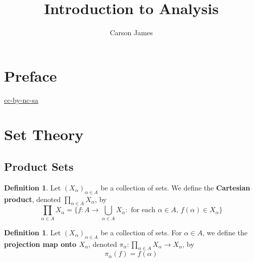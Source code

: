 \documentclass[12pt]{amsart}
\theoremstyle{definition}
\newtheorem{defn}[definition]{Definition}
\newcommand{\al}{\alpha}
\begin{document}
	
	\title{Introduction to Analysis}
	\author{Carson James}
	\maketitle
	
	\tableofcontents
	
	\section*{Preface}
	\begin{flushleft}
		\href{https://creativecommons.org/licenses/by-nc-sa/4.0/legalcode.txt}{cc-by-nc-sa}
	\end{flushleft}

	
	
	\newpage
	

	\newpage
	
	\section{Set Theory}
	\subsection{Product Sets}
	
	\begin{defn}
	Let $(X_{\al})_{\al \in A}$ be a collection of sets. We define the \textbf{Cartesian product}, denoted $\prod\limits_{\al \in A}X_{\al}$, by 
	\begin{equation*}
	\prod_{\al \in A}X_{\al} = \{f:A \rightarrow \bigcup_{\al \in A} X_{\al}: \text{ for each $\al \in A$, $f(\al) \in X_{\al}$}\}
	\end{equation*}
	\end{defn}
	
	\begin{defn}
	Let $(X_{\al})_{\al \in A}$ be a collection of sets.  For $\al \in A$, we define the \textbf{projection map onto $X_{\al}$}, denoted $\pi_{\al}:\prod\limits_{\al \in A}X_{\al} \rightarrow X_{\al}$, by 
	\begin{equation*}
	\pi_{\al}(f) = f(\al)
	\end{equation*}
	\end{defn}
	
	
	
	
	
	
	
	
	
	
	
	
	
\end{document}
